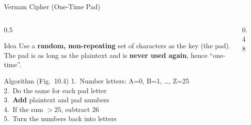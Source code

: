 \documentclass[aspectratio=169,11pt,xcolor={table}]{beamer}
\begin{document}
\begin{frame}{Vernam Cipher (One-Time Pad)}
  \begin{columns}[c]
    \begin{column}{0.5\textwidth}
      \begin{block}{Idea}
        \small Use a \textbf{random, non-repeating} set of characters as the key (the pad). The pad is as long as the plaintext and is \textbf{never used again}, hence ``one-time''.
      \end{block}
      \begin{alertblock}{Algorithm (Fig.\ 10.4)}
        \small
        1.~Number letters: A=0, B=1, \dots, Z=25\\
        2.~Do the same for each pad letter\\
        3.~\textbf{Add} plaintext and pad numbers\\
        4.~If the sum $>25$, subtract 26\\
        5.~Turn the numbers back into letters
      \end{alertblock}
    \end{column}
    \begin{column}{0.48\textwidth}
      \centering
    \end{column}
  \end{columns}
\end{frame}
\end{document}
